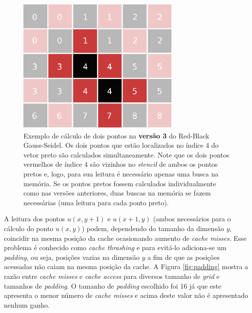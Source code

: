 \begin{figure}[h]
    \centering
    \begin{minipage}{.6\textwidth}
    \includegraphics[width=.9\textwidth]{figures/grid-calc}
    \end{minipage}%
    \begin{minipage}{.4\textwidth}
    \caption{Exemplo de cálculo de dois pontos na \textbf{versão 3} do Red-Black Gauss-Seidel. Os dois pontos que estão localizados no índice 4 do vetor preto são calculados simultaneamente. Note que os dois pontos vermelhos de índice 4 são vizinhos no \textit{stencil} de ambos os pontos pretos e, logo, para sua leitura é necessário apenas uma busca na memória. Se os pontos pretos fossem calculados individualmente como nas versões anteriores, duas buscas na memória se fazem necessárias (uma leitura para cada ponto preto).}
    \label{fig:grid-calc}
    \end{minipage}%
\end{figure}

A leitura dos pontos $u(x, y+1)$ e $u(x+1, y)$ (ambos necessários para o cálculo do ponto $u(x, y)$) podem, dependendo do tamanho da dimensão $y$, coincidir na mesma posição da cache ocasionando aumento de \textit{cache misses}. Esse problema é conhecido como \textit{cache thrashing} \cite{cachethrashing} e para evitá-lo adiciona-se um \textit{padding}, ou seja, posições vazias na dimensão $y$ a fim de que as posições acessadas não caiam na mesma posição da cache. A Figura \ref{fig:padding} mostra a razão entre \textit{cache misses} e \textit{cache access} para diversos tamanho de \textit{grid} e tamanhos de \textit{padding}. O tamanho de \textit{padding} escolhido foi 16 já que este apresenta o menor número de \textit{cache misses} e acima deste valor não é apresentado nenhum ganho.

